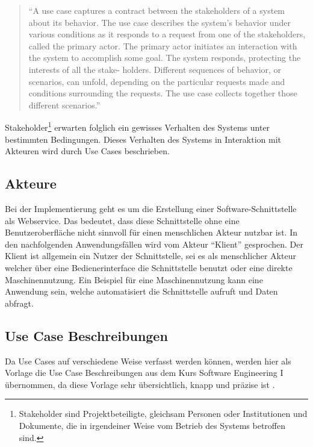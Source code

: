 \begin{quotation}
\enquote{A use case captures a contract between the stakeholders of a system about its behavior. The use case describes the system’s behavior under various conditions as it responds to a request from one of the stakeholders, called the primary actor. The primary actor initiates an interaction with the system to accomplish some goal. The system responds, protecting the interests of all the stake- holders. Different sequences of behavior, or scenarios, can unfold, depending on the particular requests made and conditions surrounding the requests. The use case collects together those different scenarios.}
\end{quotation}

\gls{Stakeholder}\footnote{Stakeholder sind Projektbeteiligte, gleichsam Personen oder Institutionen und Dokumente, die in irgendeiner Weise vom Betrieb des Systems betroffen sind.} erwarten folglich ein gewisses Verhalten des Systems unter bestimmten Bedingungen. Dieses Verhalten des Systems in Interaktion mit Akteuren wird durch \glspl{Use Case} beschrieben.


\subsection{Akteure}
Bei der Implementierung geht es um die Erstellung einer Software-Schnittstelle als \gls{Webservice}. Das bedeutet, dass diese Schnittstelle ohne eine Benutzeroberfläche nicht sinnvoll für einen menschlichen Akteur nutzbar ist. In den nachfolgenden Anwendungsfällen wird vom Akteur \enquote{Klient} gesprochen. Der Klient ist allgemein ein Nutzer der Schnittstelle, sei es als menschlicher Akteur welcher über eine Bedienerinterface die Schnittstelle benutzt oder eine direkte Maschinennutzung. Ein Beispiel für eine Maschinennutzung kann eine Anwendung sein, welche automatisiert die Schnittstelle aufruft und Daten abfragt.    

\subsection{Use Case Beschreibungen}

Da \glspl{Use Case} auf verschiedene Weise verfasst werden können, werden hier als Vorlage die \gls{Use Case} Beschreibungen aus dem Kurs Software Engineering I übernommen, da diese Vorlage sehr übersichtlich, knapp und präzise ist \citep[Vgl.][S. 120ff]{sixse1}. 

